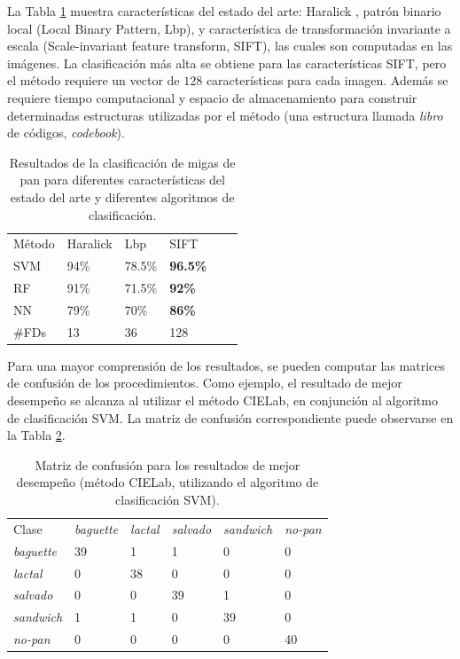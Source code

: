La Tabla \ref{tab:other} muestra características del estado del arte: Haralick \cite{Haralick73}, patrón binario local \cite{Ojala96} (Local Binary Pattern, \acrshort{Lbp}), y característica de transformación invariante a escala \cite{Lowe2004} (Scale-invariant feature transform, \acrshort{SIFT}), las cuales son computadas en las imágenes.
La clasificación más alta se obtiene para las características SIFT, pero el método requiere un vector de $128$ características para cada imagen.
Además se requiere tiempo computacional y espacio de almacenamiento para construir determinadas estructuras utilizadas por el método (una estructura llamada {\em libro} de códigos, {\em codebook}).


\begin{table}[h!]
\center
\begin{tabular}{llllll}
\hline\noalign{\smallskip}
Método & Haralick & Lbp & SIFT\\ %
\noalign{\smallskip}\hline\noalign{\smallskip}
SVM & 94\% & 78.5\% & \textbf{96.5\%} \\ %
RF  & 91\% & 71.5\% & \textbf{92\%} \\ %
NN & 79\% & 70\% & \textbf{86\%} \\ %
\noalign{\smallskip}\hline
\#FDs & 13 & 36 & 128 \\
\hline
\end{tabular}
\caption{Resultados de la clasificación de migas de pan para diferentes características del estado del arte y diferentes algoritmos de clasificación.}
\label{tab:other}       %
\end{table}


Para una mayor comprensión de los resultados, se pueden computar las matrices de confusión de los procedimientos.
Como ejemplo, el resultado de mejor desempeño se alcanza al utilizar el método CIELab, en conjunción al algoritmo de clasificación SVM.
La matriz de confusión correspondiente puede observarse en la Tabla \ref{tab:confusionmatrix}.


\begin{table}[h!]
\center
\begin{tabular}{llllll}
\hline\noalign{\smallskip}
Clase&{\em baguette} & {\em lactal} & {\em salvado} &{\em sandwich}&{\em no-pan} \\
\noalign{\smallskip}\hline\noalign{\smallskip}
{\em baguette} & 39& 1 &1 &0 &0 \\
{\em lactal} & 0& 38 &0 &0 &0  \\
{\em salvado} & 0& 0 &39 &1 &0  \\
{\em sandwich} & 1& 1 &0 &39 &0  \\
{\em no-pan} & 0& 0 &0 &0 &40  \\
\hline
\end{tabular}
\caption{Matriz de confusión para los resultados de mejor desempeño (método CIELab, utilizando el algoritmo de clasificación SVM).}
\label{tab:confusionmatrix}       %
\end{table}


